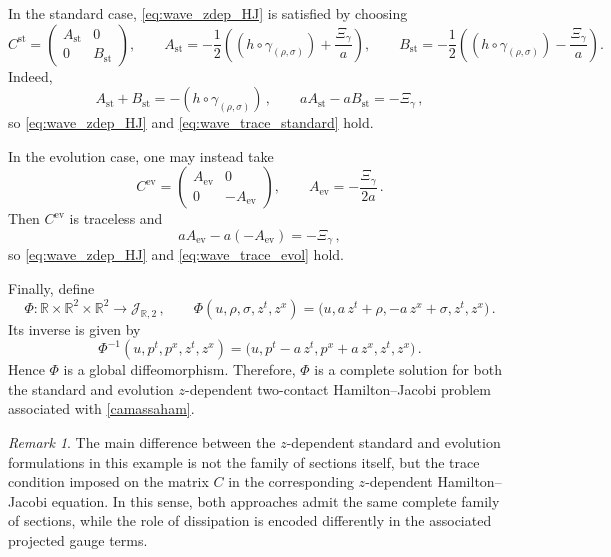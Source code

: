 \documentclass[11pt,twoside]{article}
\theoremstyle{plain}
\theoremstyle{definition}
\theoremstyle{remark}
\newtheorem{remark}[theorem]{Remark}
\begin{document}
In the standard case, \eqref{eq:wave_zdep_HJ} is satisfied by choosing
\begin{equation}\label{eq:wave_C_standard}
C^{\mathrm{st}}=
\begin{pmatrix}
A_{\mathrm{st}} & 0\\
0 & B_{\mathrm{st}}
\end{pmatrix},
\qquad
A_{\mathrm{st}}=-\frac12\left((h\circ\gamma_{(\rho,\sigma)})+\frac{\Xi_\gamma}{a}\right),
\qquad
B_{\mathrm{st}}=-\frac12\left((h\circ\gamma_{(\rho,\sigma)})-\frac{\Xi_\gamma}{a}\right).
\end{equation}
Indeed,
\[
A_{\mathrm{st}}+B_{\mathrm{st}}=-(h\circ\gamma_{(\rho,\sigma)})\,,
\qquad
aA_{\mathrm{st}}-aB_{\mathrm{st}}=-\Xi_\gamma\,,
\]
so \eqref{eq:wave_zdep_HJ} and \eqref{eq:wave_trace_standard} hold.

In the evolution case, one may instead take
\begin{equation}\label{eq:wave_C_evol}
C^{\mathrm{ev}}=
\begin{pmatrix}
A_{\mathrm{ev}} & 0\\
0 & -A_{\mathrm{ev}}
\end{pmatrix},
\qquad
A_{\mathrm{ev}}=-\frac{\Xi_\gamma}{2a}\,.
\end{equation}
Then $C^{\mathrm{ev}}$ is traceless and
\[
aA_{\mathrm{ev}}-a(-A_{\mathrm{ev}})=-\Xi_\gamma\,,
\]
so \eqref{eq:wave_zdep_HJ} and \eqref{eq:wave_trace_evol} hold.

Finally, define
\begin{equation}\label{eq:wave_complete_map}
\Phi\colon \mathbb R\times\mathbb R^2\times\mathbb R^2\to \mathcal J_{\mathbb R,2}\,,
\qquad
\Phi(u,\rho,\sigma,z^t,z^x)=\bigl(u,a\,z^t+\rho,-a\,z^x+\sigma,z^t,z^x\bigr)\,.
\end{equation}
Its inverse is given by
\begin{equation}\label{eq:wave_complete_inverse}
\Phi^{-1}(u,p^t,p^x,z^t,z^x)=\bigl(u,p^t-a\,z^t,p^x+a\,z^x,z^t,z^x\bigr)\,.
\end{equation}
Hence $\Phi$ is a global diffeomorphism. Therefore, $\Phi$ is a complete solution for both the standard and evolution $z$-dependent two-contact Hamilton--Jacobi problem associated with  \eqref{camassaham}.  

\begin{remark}
The main difference between the $z$-dependent standard and evolution formulations in this example is not the family of sections  itself, but the trace condition imposed on the matrix $C$ in the corresponding $z$-dependent Hamilton--Jacobi equation. In this sense, both approaches admit the same complete family of sections, while the role of dissipation is encoded differently in the associated projected gauge terms.
\end{remark}
\end{document}
